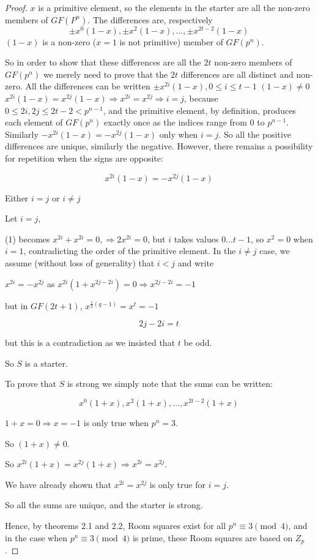 \documentclass[
  11pt,
  a4paper]{book}
\begin{document}
\begin{proof}
$x$ is a primitive element, so the elements in the starter
are all the non-zero members of $GF(P^n)$.  The differences
are, respectively
$$\pm x^0(1 - x), \pm x^2 (1 - x), \ldots, \pm x^{2t - 2}(1 - x)$$
$(1 - x)$ is a non-zero ($x = 1$ is not primitive) member of
$GF(p^n)$.

So in order to show that these differences are all the $2t$
non-zero members of $GF(p^n)$ we merely need to prove that
the $2t$ differences are all distinct and non-zero.  All the
differences can be written
$\pm x^{2i}(1 - x), 0 \leq i \leq t - 1$ $(1 - x) \neq 0$ $x^{2i}(1 - x) = x^{2j}(1 - x) \Rightarrow x^{2i} = x^{2j} \Rightarrow i = j$,
because $0 \leq 2i, 2j \leq 2t - 2 < p^{n - 1}$,
and the primitive element, by definition,
produces each element of $GF(p^n)$ exactly once as the
indices range from 0 to $p^{n - 1}$.  Similarly
$-x^{2i}(1 - x) = -x^{2j}(1 - x)$ only when $i = j$.
So all the positive differences are unique, similarly the negative.
However, there remains a possibility for repetition when the
signs are opposite:

$$x^{2i}(1 - x) = -x^{2j}(1 - x)$$

Either $i = j$ or $i \neq j$

Let $i = j$,

(1) becomes $x^{2i} + x^{2i} = 0, \Rightarrow 2x^{2i} = 0$,
but $i$ takes values $0 \ldots t - 1$, so $x^2 = 0$ when $i = 1$,
contradicting the order of the primitive element.  In the
$i \neq j$ case, we assume (without loss of generality) that
$i < j$ and write

$x^{2i} = -x^{2j}$ as $x^{2i}(1 + x^{2j - 2i}) = 0 \Rightarrow x^{2j - 2i} = -1$

but in $GF(2t + 1)$, $x^{\frac{1}{2}(q - 1)} = x^t = -1$

$$2j - 2i = t$$

but this is a contradiction as we insisted that $t$ be odd.

So $S$ is a starter.

To prove that $S$ is strong we simply note that the sums can
be written:

$$x^0(1 + x), x^2(1 + x), \ldots, x^{2t - 2}(1 + x)$$

$1 + x = 0 \Rightarrow x = -1$ is only true when $p^n = 3$.

So $(1 + x) \neq 0$.

So $x^{2i}(1 + x) = x^{2j}(1 + x) \Rightarrow x^{2i} = x^{2j}$.

We have already shown that $x^{2i} = x^{2j}$ is only true for
$i = j$.

So all the sums are unique, and the starter is strong.

Hence, by theorems 2.1 and 2.2, Room squares exist for all
$p^n\equiv 3\pmod 4$, and in the case when
$p^n\equiv 3\pmod 4$ is
prime, these Room squares are based on $Z_p$.
\end{proof}
\end{document}
